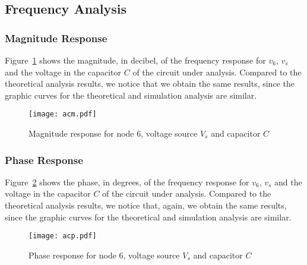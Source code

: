 \subsection{Frequency Analysis}

\subsubsection{Magnitude Response}

Figure~\ref{fig:acm} shows the magnitude, in decibel, of the frequency response for $v_6$, $v_s$ and the voltage in the capacitor $C$ 
of the circuit under analysis. Compared to the theoretical analysis results, we notice that we obtain the same results, 
since the graphic curves for the theoretical and simulation analysis are similar.

\begin{figure}[H] \centering
\texttt{[image: acm.pdf]}
\caption{Magnitude response for node 6, voltage source $V_s$ and capacitor $C$}
\label{fig:acm}
\end{figure}



\subsubsection{Phase Response}

Figure~\ref{fig:acp} shows the phase, in degrees, of the frequency response for $v_6$, $v_s$ and the voltage in the capacitor $C$ 
of the circuit under analysis. Compared to the theoretical analysis results, we notice that, again, we obtain the same results, 
since the graphic curves for the theoretical and simulation analysis are similar.

\begin{figure}[H] \centering
\texttt{[image: acp.pdf]}
\caption{Phase response for node 6, voltage source $V_s$ and capacitor $C$}
\label{fig:acp}
\end{figure}

